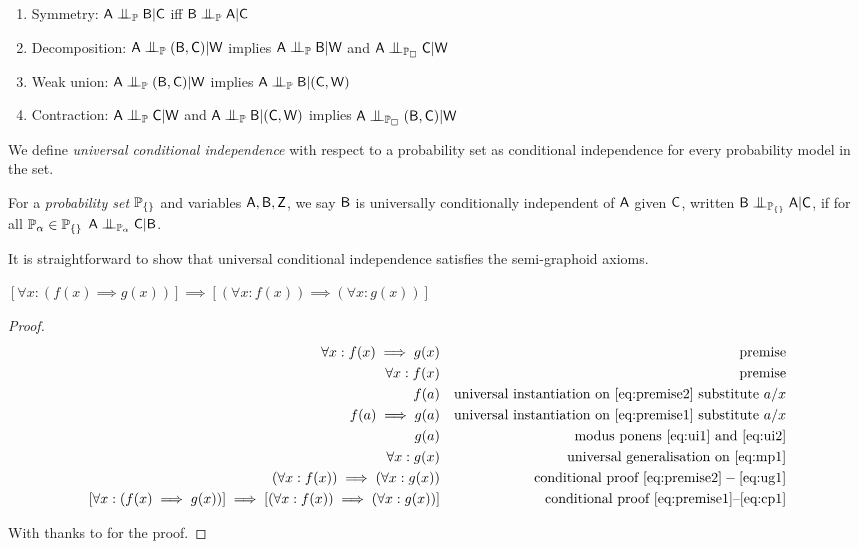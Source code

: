 \begin{enumerate}
	\item Symmetry: $\RV{A}\CI_{\prob{P}} \RV{B}|\RV{C}$ iff $\RV{B}\CI_{\prob{P}} \RV{A}|\RV{C}$
	\item Decomposition: $\RV{A}\CI_{\prob{P}} (\RV{B},\RV{C})|\RV{W}$ implies $\RV{A}\CI_{\prob{P}}\RV{B}|\RV{W}$ and $\RV{A}\CI_{\prob{P}_\square}\RV{C}|\RV{W}$
	\item Weak union: $\RV{A}\CI_{\prob{P}}(\RV{B},\RV{C})|\RV{W}$ implies $\RV{A}\CI_{\prob{P}}\RV{B}|(\RV{C},\RV{W})$
	\item Contraction: $\RV{A}\CI_{\prob{P}}\RV{C}|\RV{W}$ and $\RV{A}\CI_{\prob{P}}\RV{B}|(\RV{C},\RV{W})$ implies $\RV{A}\CI_{\prob{P}_\square}(\RV{B},\RV{C})|\RV{W}$
\end{enumerate}

We define \emph{universal conditional independence} with respect to a probability set as conditional independence for every probability model in the set.

\begin{definition}
For a \emph{probability set} $\mathbb{P}_{\{\}}$ and variables $\mathsf{A},\mathsf{B},\mathsf{Z}$, we say $\mathsf{B}$ is universally conditionally independent of $\mathsf{A}$ given $\mathsf{C}$, written $\RV{B}\CI_{\model{P}_{\{\}}}\RV{A}|\RV{C}$, if for all $\mathbb{P}_{\alpha}\in \mathbb{P}_{\{\}}$ $\RV{A}\CI_{\prob{P}_\alpha} \RV{C}|\RV{B}$.
\end{definition}

It is straightforward to show that universal conditional independence satisfies the semi-graphoid axioms.

\begin{lemma}\label{lem:distribute_quantifier}
$[\forall x: (f(x)\implies g(x))]\implies[(\forall x: f(x))\implies(\forall x: g(x))]$
\end{lemma}

\begin{proof}
\begin{align}
	\forall x: f(x) \implies g(x)&&\text{premise}\label{eq:premise1}\\
	\forall x: f(x)&& \text{premise}\label{eq:premise2}\\
	f(a) && \text{universal instantiation on }\ref{eq:premise2}\text{ substitute }a/x\label{eq:ui1}\\
	f(a)\implies g(a) && \text{universal instantiation on }\ref{eq:premise1}\text{ substitute }a/x\label{eq:ui2}\\
	g(a)&&\text{ modus ponens }\ref{eq:ui1}\text{ and }\ref{eq:ui2}\label{eq:mp1}\\
	\forall x: g(x)&&\text{universal generalisation on }\ref{eq:mp1}\label{eq:ug1}\\
	(\forall x: f(x))\implies(\forall x: g(x))&& \text{conditional proof }\ref{eq:premise2}-\ref{eq:ug1}\label{eq:cp1}\\
	[\forall x: (f(x)\implies g(x))]\implies[(\forall x: f(x))\implies(\forall x: g(x))]&& \text{conditional proof }\ref{eq:premise1}\text{--}\ref{eq:cp1}
\end{align}

With thanks to \citet{1377555} for the proof.
\end{proof}

